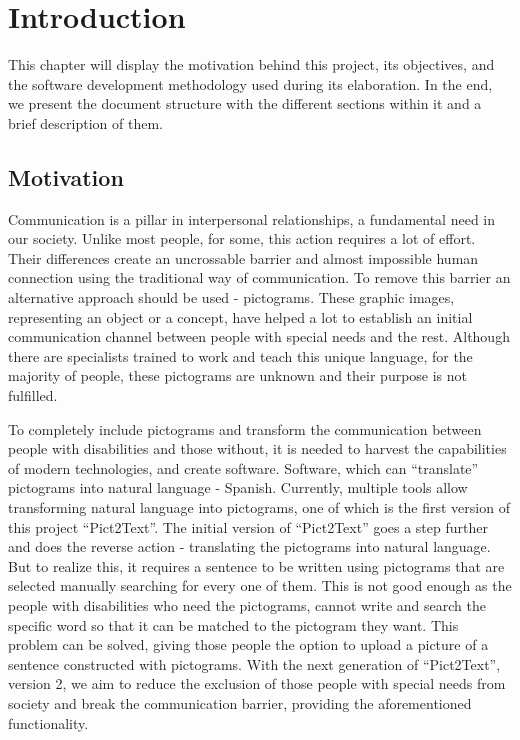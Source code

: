 
\chapter{Introduction}
\label{cap:introduction}

This chapter will display the motivation behind this project, its objectives, and the software development methodology used during its elaboration. In the end, we present the document structure with the different sections within it and a brief description of them.

\section{Motivation}
Communication is a pillar in interpersonal relationships, a fundamental need in our society. Unlike most people, for some, this action requires a lot of effort. Their differences create an uncrossable barrier and almost impossible human connection using the traditional way of communication. To remove this barrier an alternative approach should be used - pictograms. These graphic images, representing an object or a concept, have helped a lot to establish an initial communication channel between people with special needs and the rest. Although there are specialists trained to work and teach this unique language, for the majority of people, these pictograms are unknown and their purpose is not fulfilled.

To completely include pictograms and transform the communication between people with disabilities and those without, it is needed to harvest the capabilities of modern technologies, and create software. Software, which can ``translate'' pictograms into natural language - Spanish.
Currently, multiple tools allow transforming natural language into pictograms, one of which is the first version of this project ``Pict2Text''. The initial version of ``Pict2Text'' goes a step further and does the reverse action - translating the pictograms into natural language. But to realize this, it requires a sentence to be written using pictograms that are selected manually searching for every one of them. This is not good enough as the people with disabilities who need the pictograms, cannot write and search the specific word so that it can be matched to the pictogram they want. This problem can be solved, giving those people the option to upload a picture of a sentence constructed with pictograms. With the next generation of ``Pict2Text'', version 2, we aim to reduce the exclusion of those people with special needs from society and break the communication barrier, providing the aforementioned functionality.

